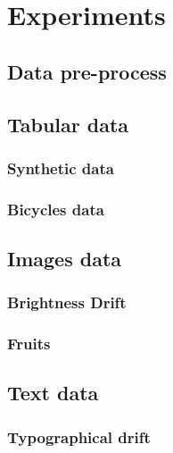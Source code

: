\chapter{Experiments}\label{ch:experiments}

\section{Data pre-process}\label{sec:preprocess}

\section{Tabular data}\label{sec:tabular_data}

\subsection{Synthetic data}\label{subsec:sythetic_data}

\subsection{Bicycles data}\label{subsec:bicycles_data}

\section{Images data}\label{sec:images_data}

\subsection{Brightness Drift}\label{subsec:contrast_drift}

\subsection{Fruits}\label{subsec:fruits}

\section{Text data}\label{sec:text_data}

\subsection{Typographical drift}\label{subsec:typographical_drift}